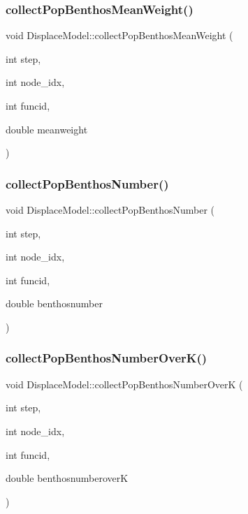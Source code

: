 \mbox{\label{class_displace_model_a209567affd6b0aa328db50f71bbb6abc}} 
\subsubsection{\texorpdfstring{collectPopBenthosMeanWeight()}{collectPopBenthosMeanWeight()}}
{\footnotesize\ttfamily void Displace\+Model\+::collect\+Pop\+Benthos\+Mean\+Weight (\begin{DoxyParamCaption}\item[{int}]{step,  }\item[{int}]{node\+\_\+idx,  }\item[{int}]{funcid,  }\item[{double}]{meanweight }\end{DoxyParamCaption})}

\mbox{\label{class_displace_model_ac947f00a7e993adac96922a055f92b0e}} 
\subsubsection{\texorpdfstring{collectPopBenthosNumber()}{collectPopBenthosNumber()}}
{\footnotesize\ttfamily void Displace\+Model\+::collect\+Pop\+Benthos\+Number (\begin{DoxyParamCaption}\item[{int}]{step,  }\item[{int}]{node\+\_\+idx,  }\item[{int}]{funcid,  }\item[{double}]{benthosnumber }\end{DoxyParamCaption})}

\mbox{\label{class_displace_model_aeaacbc007427699580847ed2286e8519}} 
\subsubsection{\texorpdfstring{collectPopBenthosNumberOverK()}{collectPopBenthosNumberOverK()}}
{\footnotesize\ttfamily void Displace\+Model\+::collect\+Pop\+Benthos\+Number\+OverK (\begin{DoxyParamCaption}\item[{int}]{step,  }\item[{int}]{node\+\_\+idx,  }\item[{int}]{funcid,  }\item[{double}]{benthosnumberoverK }\end{DoxyParamCaption})}

